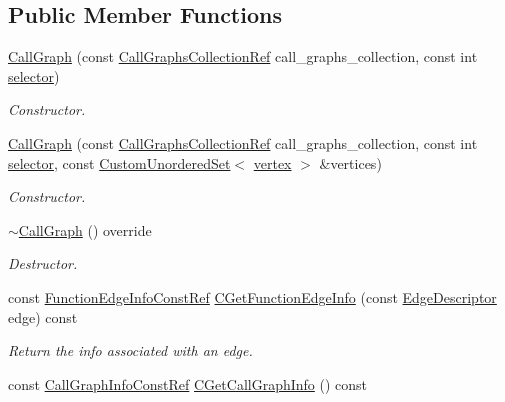 \subsection*{Public Member Functions}
\begin{DoxyCompactItemize}
\item 
\hyperlink{classCallGraph_a47b6528866d0e92350674d18285704c1}{Call\+Graph} (const \hyperlink{call__graph_8hpp_afccdc7a00d60cb4ee70f44b223f858bb}{Call\+Graphs\+Collection\+Ref} call\+\_\+graphs\+\_\+collection, const int \hyperlink{structgraph_ab06c362711200ca8c15e3d85fef7957b}{selector})
\begin{DoxyCompactList}\small\item\em Constructor. \end{DoxyCompactList}\item 
\hyperlink{classCallGraph_ae5a247b26cb929c45b75ee84290488d0}{Call\+Graph} (const \hyperlink{call__graph_8hpp_afccdc7a00d60cb4ee70f44b223f858bb}{Call\+Graphs\+Collection\+Ref} call\+\_\+graphs\+\_\+collection, const int \hyperlink{structgraph_ab06c362711200ca8c15e3d85fef7957b}{selector}, const \hyperlink{classCustomUnorderedSet}{Custom\+Unordered\+Set}$<$ \hyperlink{graph_8hpp_abefdcf0544e601805af44eca032cca14}{vertex} $>$ \&vertices)
\begin{DoxyCompactList}\small\item\em Constructor. \end{DoxyCompactList}\item 
\hyperlink{classCallGraph_a1deddb919675f2c137bb30d718e69cd9}{$\sim$\+Call\+Graph} () override
\begin{DoxyCompactList}\small\item\em Destructor. \end{DoxyCompactList}\item 
const \hyperlink{call__graph_8hpp_aace94cefc6132ce240df639f7a87d969}{Function\+Edge\+Info\+Const\+Ref} \hyperlink{classCallGraph_a0c702a72c5f2e9472f1d36f079861fe3}{C\+Get\+Function\+Edge\+Info} (const \hyperlink{graph_8hpp_a9eb9afea34e09f484b21f2efd263dd48}{Edge\+Descriptor} edge) const
\begin{DoxyCompactList}\small\item\em Return the info associated with an edge. \end{DoxyCompactList}\item 
const \hyperlink{call__graph_8hpp_a347c2311be22aecc58822b8d40776f47}{Call\+Graph\+Info\+Const\+Ref} \hyperlink{classCallGraph_a83bb9b87d1ff9829a11affd314b94e8f}{C\+Get\+Call\+Graph\+Info} () const

\end{DoxyCompactItemize}
